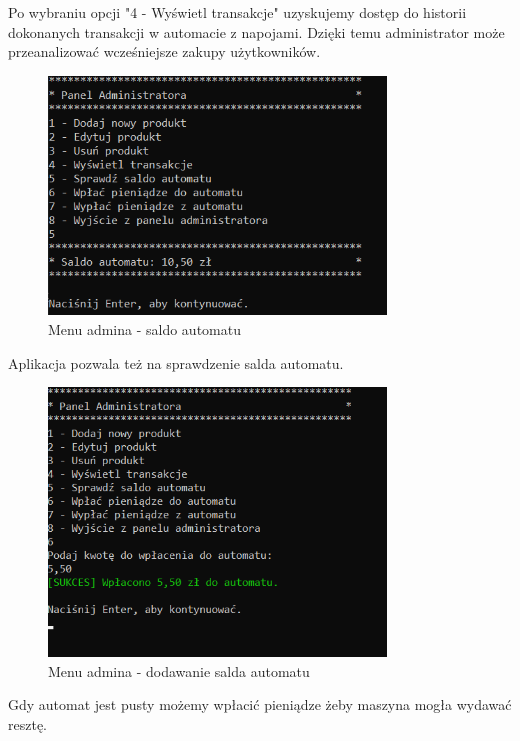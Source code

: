 Po wybraniu opcji "4 - Wyświetl transakcje" uzyskujemy dostęp do historii dokonanych transakcji w automacie z napojami. Dzięki temu administrator może przeanalizować wcześniejsze zakupy użytkowników.

\begin{figure}[H] 
    \centering
    \includegraphics[width=0.8\textwidth]{grafiki/saldo_automatu.png}
    \caption{\footnotesize Menu admina - saldo automatu}	
    \label{fig:5.18}
\end{figure}

Aplikacja pozwala też na sprawdzenie salda automatu.

\newpage

\begin{figure}[H] 
    \centering
    \includegraphics[width=0.8\textwidth]{grafiki/wplacanie_automat.png}
    \caption{\footnotesize Menu admina - dodawanie salda automatu}	
    \label{fig:5.19}
\end{figure}

Gdy automat jest pusty możemy wpłacić pieniądze żeby maszyna mogła wydawać resztę.

